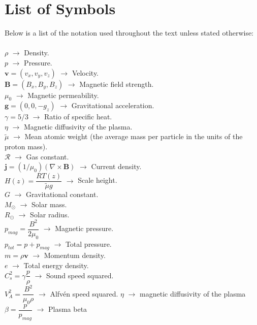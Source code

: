 \documentclass[12pt]{ociamthesis}
\newcommand{\rgas}{\mathcal{R}}
\newcommand{\Alfven}{Alfv\'{e}n }
\begin{document}
\baselineskip=18pt

\setcounter{secnumdepth}{3}
\setcounter{tocdepth}{3}

\section*{List of Symbols}
Below is a list of the notation used throughout the text unless stated otherwise: \\ \\
$\rho$ $\rightarrow$ Density.  \\
$p$ $\rightarrow$ Pressure. \\
$\boldsymbol{v} = (v_x, v_y, v_z)$ $\rightarrow$ Velocity.  \\
$\boldsymbol{B} = (B_x,B_y,B_z)$ $\rightarrow$ Magnetic field strength. \\
$\mu_0$ $\rightarrow$ Magnetic permeability. \\
$\boldsymbol{g} = (0,0,-g_z)$ $\rightarrow$ Gravitational acceleration. \\
$\gamma = 5/3$ $\rightarrow$ Ratio of specific heat. \\
$\eta$ $\rightarrow$ Magnetic diffusivity of the plasma. \\
$\widetilde{\mu}$ $\rightarrow$ Mean atomic weight (the average mass per particle in the units of the proton mass).  \\
$\rgas$ $\rightarrow$ Gas constant.\\
$\boldsymbol{j} = (1 / \mu_0) (\nabla \times \boldsymbol{B})$ $\rightarrow$ Current density.  \\
$H(z) = \dfrac{R T(z)}{\widetilde{\mu} g}$ $\rightarrow$ Scale height.  \\
$G$ $\rightarrow$ Gravitational constant. \\
$M_{\odot}$ $\rightarrow$ Solar mass. \\
$R_{\odot}$ $\rightarrow$ Solar radius. \\
$p_{mag} = \dfrac{B^2}{2 \mu_0} $ $\rightarrow$ Magnetic pressure. \\
$p_{tot} = p + p_{mag} $ $\rightarrow$ Total pressure. \\
$m = \rho \boldsymbol{v}$ $\rightarrow$ Momentum density. \\
$e$ $\rightarrow$ Total energy density. \\ 
$C^2_s = \gamma \dfrac{p}{\rho}$ $\rightarrow$ Sound speed squared. \\ 
$V_A^2=\dfrac{B^2}{\mu_0 \rho}$ $\rightarrow$ \Alfven speed squared. 
$\eta$ $\rightarrow$ magnetic diffusivity of the plasma
$\beta=\dfrac{p}{p_{mag}}$ $\rightarrow$ Plasma beta
\clearpage
\setcounter{page}{1}
\end{document}
